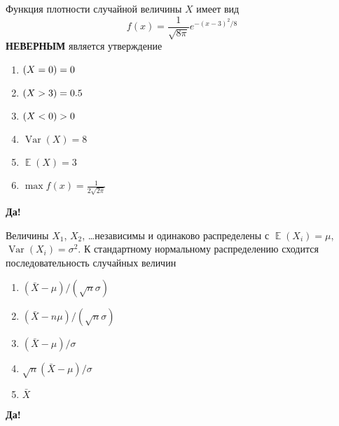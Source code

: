 \documentclass[t]{beamer}
\DeclareMathOperator{\Var}{Var}
\DeclareMathOperator{\E}{\mathbb{E}}
\let\P\relax
\DeclareMathOperator{\P}{\mathbb{P}}
\begin{document}
 \begin{frame} \label{30-Yes} 
\begin{block}{30} 


Функция плотности случайной величины $X$ имеет вид
\[
f(x)=\frac{1}{\sqrt{8\pi}} e^{-(x-3)^2/8}
\]
 \textbf{НЕВЕРНЫМ} является утверждение
 


 \end{block} 
\begin{enumerate} 
\item[] \hyperlink{30-No}{\beamergotobutton{} $\P(X=0)=0$}
\item[] \hyperlink{30-No}{\beamergotobutton{} $\P(X>3)=0.5$}
\item[] \hyperlink{30-No}{\beamergotobutton{} $\P(X<0)>0$}
\item[] \hyperlink{30-Yes}{\beamergotobutton{} $\Var(X)=8$ }
\item[] \hyperlink{30-No}{\beamergotobutton{} $\E(X)=3$}
\item[] \hyperlink{30-No}{\beamergotobutton{} $\max f(x) = \frac{1}{2\sqrt{2\pi}}$}
\end{enumerate} 

 \textbf{Да!} 
 \hyperlink{31}{}\end{frame} 


 \begin{frame} \label{31-Yes} 
\begin{block}{31} 

Величины $X_1$, $X_2$, \ldots независимы и одинаково распределены с $\E(X_i)=\mu$, $\Var(X_i)=\sigma^2$. К стандартному нормальному распределению  сходится последовательность случайных величин
 


 \end{block} 
\begin{enumerate} 
\item[] \hyperlink{31-No}{\beamergotobutton{} $(\bar X - \mu) /(\sqrt{n}\sigma)$}
\item[] \hyperlink{31-No}{\beamergotobutton{} $(\bar X - n\mu) /(\sqrt{n}\sigma)$}
\item[] \hyperlink{31-No}{\beamergotobutton{} $(\bar X - \mu) /\sigma$}
\item[] \hyperlink{31-Yes}{\beamergotobutton{} $\sqrt{n}(\bar X - \mu) /\sigma$ }
\item[] \hyperlink{31-No}{\beamergotobutton{} $\bar X$}
\end{enumerate} 

 \textbf{Да!} 
 \hyperlink{32}{}\end{frame} 
\end{document}
